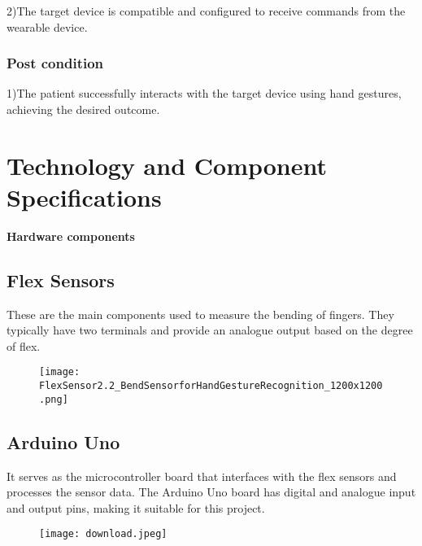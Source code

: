 \documentclass[a4paper,12pt,oneside]{report}
\begin{document}
2)The target device is compatible and configured to receive commands from the wearable device.

\subsection{Post condition}
\par
1)The patient successfully interacts with the target device using hand gestures, achieving the desired outcome.



\newpage
 \chapter{Technology and Component Specifications}
 \label{chap:Hardware Design}
 \textbf{\huge Hardware components}
 \section{Flex Sensors}
 \noindent These are the main components used to measure the
bending of fingers. They typically have two terminals and provide an
analogue output based on the degree of flex.
\begin{figure}[h]
    \centering
    \begin{minipage}{0.5\textwidth}
        \centering
        \texttt{[image: FlexSensor2.2\_BendSensorforHandGestureRecognition\_1200x1200.png]}
        \label{fig:flex-sensor}
    \end{minipage}
\end{figure}



\section{Arduino Uno}
 It serves as the microcontroller board that interfaces
with the flex sensors and processes the sensor data. The Arduino Uno
board has digital and analogue input and output pins, making it suitable
for this project.
\begin{figure}[h]
    \centering
    \begin{minipage}{0.5\textwidth}
        \centering
        \texttt{[image: download.jpeg]}
        \label{fig:flex-sensor}
    \end{minipage}
\end{figure}
\\
\end{document}
